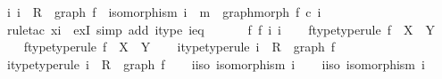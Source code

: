 \begin{isabellebody}
\ {\isachardoublequoteopen}{\isasymexists}i{\isachardot}{\kern0pt}\ i\ {\isacharcolon}{\kern0pt}\ R\ {\isasymrightarrow}\ graph\ f\ {\isasymand}\ isomorphism\ i\ {\isasymand}\ m\ {\isacharequal}{\kern0pt}\ graph{\isacharunderscore}{\kern0pt}morph\ f\ {\isasymcirc}\isactrlsub c\ i{\isachardoublequoteclose}\isanewline
\ \ \ \ \ \ \isamarkupfalse%
\ {\isacharparenleft}{\kern0pt}rule{\isacharunderscore}{\kern0pt}tac\ x{\isacharequal}{\kern0pt}i\ \ exI{\isacharcomma}{\kern0pt}\ simp\ add{\isacharcolon}{\kern0pt}\ i{\isacharunderscore}{\kern0pt}type\ i{\isacharunderscore}{\kern0pt}eq{\isacharparenright}{\kern0pt}\isanewline
\ \ \isamarkupfalse%
\isanewline
{}\isamarkupfalse%
\isanewline
\ \ \isamarkupfalse%
\ f{}\ f{}\ i{}\ i{}\isanewline
\ \ \isamarkupfalse%
\ f{}{\isacharunderscore}{\kern0pt}type{\isacharbrackleft}{\kern0pt}type{\isacharunderscore}{\kern0pt}rule{\isacharbrackright}{\kern0pt}{\isacharcolon}{\kern0pt}\ {\isachardoublequoteopen}f{}\ {\isacharcolon}{\kern0pt}\ X\ {\isasymrightarrow}\ Y{\isachardoublequoteclose}\isanewline
\ \ \isamarkupfalse%
\ f{}{\isacharunderscore}{\kern0pt}type{\isacharbrackleft}{\kern0pt}type{\isacharunderscore}{\kern0pt}rule{\isacharbrackright}{\kern0pt}{\isacharcolon}{\kern0pt}\ {\isachardoublequoteopen}f{}\ {\isacharcolon}{\kern0pt}\ X\ {\isasymrightarrow}\ Y{\isachardoublequoteclose}\isanewline
\ \ \isamarkupfalse%
\ i{}{\isacharunderscore}{\kern0pt}type{\isacharbrackleft}{\kern0pt}type{\isacharunderscore}{\kern0pt}rule{\isacharbrackright}{\kern0pt}{\isacharcolon}{\kern0pt}\ {\isachardoublequoteopen}i{}\ {\isacharcolon}{\kern0pt}\ R\ {\isasymrightarrow}\ graph\ f{}{\isachardoublequoteclose}\isanewline
\ \ \isamarkupfalse%
\ i{}{\isacharunderscore}{\kern0pt}type{\isacharbrackleft}{\kern0pt}type{\isacharunderscore}{\kern0pt}rule{\isacharbrackright}{\kern0pt}{\isacharcolon}{\kern0pt}\ {\isachardoublequoteopen}i{}\ {\isacharcolon}{\kern0pt}\ R\ {\isasymrightarrow}\ graph\ f{}{\isachardoublequoteclose}\isanewline
\ \ \isamarkupfalse%
\ i{}{\isacharunderscore}{\kern0pt}iso{\isacharcolon}{\kern0pt}\ {\isachardoublequoteopen}isomorphism\ i{}{\isachardoublequoteclose}\isanewline
\ \ \isamarkupfalse%
\ i{}{\isacharunderscore}{\kern0pt}iso{\isacharcolon}{\kern0pt}\ {\isachardoublequoteopen}isomorphism\ i{}{\isachardoublequoteclose}\isanewline

\end{isabellebody}
